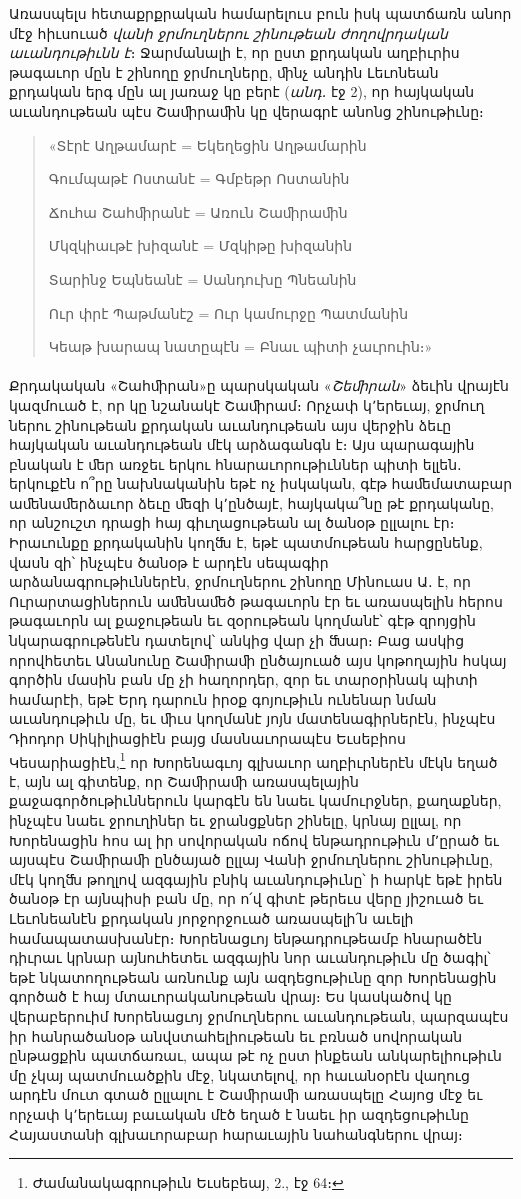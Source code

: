 \documentclass{article}
\begin{document}
{Առասպելս հետաքրքրական համարելուս բուն իսկ պատճառն անոր մէջ հիւսուած \emph{վանի ջրմուղներու շինութեան ժողովրդական աւանդութիւնն է}։ Ջարմանալի է, որ ըստ քրդական աղբիւրիս թագաւոր մըն է շինողը ջրմուղները, ﬕնչ անդին Լեւոնեան քրդական երգ մըն ալ յառաջ կը բերէ (\emph{անդ․} էջ 2), որ հայկական աւանդութեան պէս Շաﬕրաﬕն կը վերագրէ անոնց շինութիւնը։
\begin{quotation}
\arm
\small
«Տէրէ Աղթամարէ = Եկեղեցին Աղթամարին

Գումպաթէ Ոստանէ = Գմբեթր Ոստանին

Ճուհա Շահﬕրանէ = Առուն Շաﬕրաﬕն

Մկզկիաւթէ խիզանէ = Մզկիթը խիզանին

Տարինջ Եպնեանէ = Սանդուխը Պնեանին

Ուր փրէ Պաթմանէշ = Ուր կամուրջը Պատմանին

Կեաթ խարապ նատըպէն = Բնաւ պիտի չաւրուին։»
\end{quotation}
\paragraph{}
Քրդակական «Շահﬕրան»ը պարսկական «\emph{Շեﬕրան}» ձեւին վրայէն կազմուած է, որ կը նշանակէ Շաﬕրամ։ Որչափ կ՚երեւայ, ջրմուղ ներու շինութեան քրդական աւանդութեան այս վերջին ձեւը հայկական աւանդութեան մէկ արձագանգն է։ Այս պարագային բնական է ﬔր առջեւ երկու հնարաւորութիւններ պիտի ելլեն․ երկուքէն ո՞րը նախնականին եթէ ոչ իսկական, գէթ հաﬔմատաբար աﬔնաﬔրձաւոր ձեւը ﬔզի կ՚ընծայէ, հայկակա՞նը թէ քրդականը, որ անշուշտ դրացի հայ գիւղացութեան ալ ծանօթ ըլլալու էր։ Իրաւունքը քրդականին կողﬓ է, եթէ պատմութեան հարցընենք, վասն զի՝ ինչպէս ծանօթ է արդէն սեպագիր արձանագրութիւններէն, ջրմուղներու շինողը Մինուաս Ա․ է, որ Ուրարտացիներուն աﬔնաﬔծ թագաւորն էր եւ առասպելին հերոս թագաւորն ալ քաջութեան եւ զօրութեան կողմանէ՝ գէթ զրոյցին նկարագրութենէն դատելով՝ անկից վար չի ﬓար։ Բաց ասկից որովհետեւ Անանունը Շաﬕրաﬕ ընծայուած այս կոթողային հսկայ գործին մասին բան մը չի հաղորդեր, զոր եւ տարօրինակ պիտի համարէի, եթէ Երդ դարուն իրօք գոյութիւն ունենար նման աւանդութիւն մը, եւ ﬕւս կողմանէ յոյն մատենագիրներէն, ինչպէս Դիոդոր Սիկիլիացիէն բայց մասնաւորապէս Եւսեբիոս Կեսարիացիէն,\footnote{Ժամանակագրութիւն Եւսեբեայ, 2., էջ 64։} որ Խորենագւոյ գլխաւոր աղբիւրներէն մէկն եղած է, այն ալ գիտենք, որ Շաﬕրաﬕ առասպելային քաջագործութիւններուն կարգէն են նաեւ կամուրջներ, քաղաքներ, ինչպէս նաեւ ջրուղիներ եւ ջրանցքներ շինելը, կրնայ ըլլալ, որ Խորենացին հոս ալ իր սովորական ոճով ենթադրութիւն մ՚ըրած եւ այսպէս Շաﬕրաﬕ ընծայած ըլլայ Վանի ջրմուղներու շինութիւնը, մէկ կողﬓ թողլով ազգային բնիկ աւանդութիւնը՝ ի հարկէ եթէ իրեն ծանօթ էր այնպիսի բան մը, որ ո՛վ գիտէ թերեւս վերը յիշուած եւ Լեւոնեանէն քրդական յորջորջուած առասպելի՛ն աւելի համապատասխանէր։ Խորենացւոյ ենթադրութեամբ հնարածէն դիւրաւ կրնար այնուհետեւ ազգային նոր աւանդութիւն մը ծագիլ՝ եթէ նկատողութեան առնունք այն ազդեցութիւնը զոր Խորենացին գործած է հայ մտաւորականութեան վրայ։ Ես կասկածով կը վերաբերուիմ Խորենացւոյ ջրմուղներու աւանդութեան, պարզապէս իր հանրածանօթ անվստահելիութեան եւ բռնած սովորական ընթացքին պատճառաւ, ապա թէ ոչ ըստ ինքեան անկարելիութիւն մը չկայ պատմուածքին մէջ, նկատելով, որ հաւանօրէն վաղուց արդէն մուտ գտած ըլլալու է Շաﬕրաﬕ առասպելը Հայոց մէջ եւ որչափ կ՚երեւայ բաւական մէծ եղած է նաեւ իր ազդեցութիւնը Հայաստանի գլխաւորաբար հարաւային նահանգներու վրայ։

}
\end{document}
